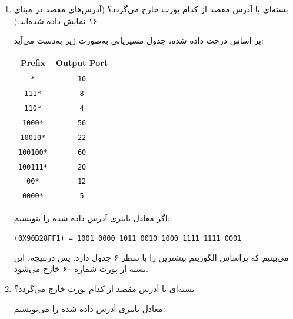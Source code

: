 \begin{enumerate}
	\item بسته‌ای با آدرس مقصد  از کدام پورت خارج می‌گردد؟ (آدرس‌های مقصد در مبنای ۱۶ نمایش داده شده‌اند.)
	
	\begin{qsolve}
		بر اساس درخت داده شده، جدول مسیریابی به‌صورت زیر به‌دست می‌آید:
		
		\begin{latin}
			\begin{center}
				\begin{tabular}{|c|c|}
					\hline
					\textbf{Prefix} & \textbf{Output Port} \\
					\hline\hline
					\texttt{*} & \texttt{10} \\
					\hline\hline
					\texttt{111*} & \texttt{8} \\
					\hline
					\texttt{110*} & \texttt{4} \\
					\hline
					\texttt{1000*} & \texttt{56} \\
					\hline
					\texttt{10010*} & \texttt{22} \\
					\hline
					\texttt{100100*} & \texttt{60} \\
					\hline
					\texttt{100111*} & \texttt{20} \\
					\hline
					\texttt{00*} & \texttt{12} \\
					\hline
					\texttt{0000*} & \texttt{5} \\
					\hline
				\end{tabular}
			\end{center}
		\end{latin}
		
		اگر معادل باینری آدرس داده شده را بنویسیم:
		
		\begin{latin}
			\texttt{(0X90B28FF1) = 1001 0000 1011 0010 1000 1111 1111 0001}
		\end{latin}
		
		می‌بینیم که براساس الگوریتم  بیشترین  را با سطر ۶ جدول دارد. پس درنتیجه، این بسته از پورت شماره ۶۰ خارج می‌شود.
	\end{qsolve}
	
	
	
	
	
	\item بسته‌ای با آدرس مقصد  از کدام پورت خارج می‌گردد؟
	\begin{qsolve}
		معادل باینری آدرس داده شده را می‌نویسیم:
		

\end{qsolve}
\end{enumerate}
